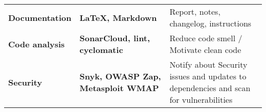 {\begin{tabular}{| p{0.235\linewidth} | p{0.375\linewidth} | p{0.575\linewidth}|}
        \textbf{Documentation} & \textbf{LaTeX, Markdown} & Report, notes, changelog, instructions \\
        \textbf{Code analysis} & \textbf{SonarCloud, lint, cyclomatic} & Reduce code smell / Motivate clean code \\
        \textbf{Security} & \textbf{Snyk, OWASP Zap, Metasploit WMAP} & Notify about Security issues and updates to dependencies and scan for vulnerabilities \\


        \hline
    \end{tabular}
}
